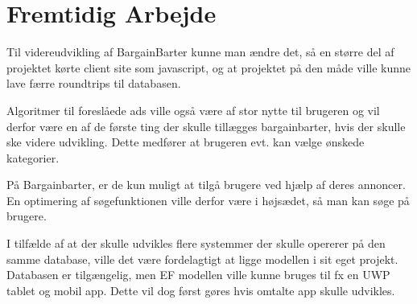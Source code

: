 \chapter{Fremtidig Arbejde}

Til videreudvikling af BargainBarter kunne man ændre det, så en større del af projektet kørte client site som javascript, og at projektet på den måde ville kunne lave færre roundtrips til databasen. 

Algoritmer til foreslåede ads ville også være af stor nytte til brugeren og vil derfor være en af de første ting der skulle tillægges bargainbarter, hvis der skulle ske videre udvikling. Dette medfører at brugeren evt. kan vælge ønskede kategorier.

På Bargainbarter, er de kun muligt at tilgå brugere ved hjælp af deres annoncer. En optimering af søgefunktionen ville derfor være i højsædet, så man kan søge på brugere.   

I tilfælde af at der skulle udvikles flere systemmer der skulle opererer på den samme database, ville det være fordelagtigt at ligge modellen i sit eget projekt. Databasen er tilgængelig, men EF modellen ville kunne bruges til fx en UWP tablet og mobil app. Dette vil dog først gøres hvis omtalte app skulle udvikles.  